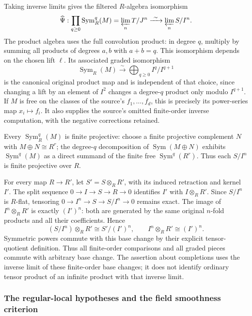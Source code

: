 Taking inverse limits gives the filtered \(R\)-algebra isomorphism \[
\widehat\Psi:\prod_{q\ge0}\operatorname{Sym}_R^q(M)
=\varprojlim_n T/J^n
\xrightarrow{\ \sim\ }\varprojlim_n S/I^n.
\] The product algebra uses the full convolution product: in degree \(q\), multiply by summing all products of degrees \(a,b\) with \(a+b=q\). This isomorphism depends on the chosen lift \(\ell\). Its associated graded isomorphism \[
\operatorname{Sym}_R(M)\xrightarrow{\ \sim\ }\bigoplus_{q\ge0}I^q/I^{q+1}
\] is the canonical original product map and is independent of that choice, since changing a lift by an element of \(I^2\) changes a degree-\(q\) product only modulo \(I^{q+1}\). If \(M\) is free on the classes of the source's \(f_1,\ldots,f_d\), this is precisely its power-series map \(x_i\mapsto f_i\). It also supplies the source's omitted finite-order inverse computation, with the negative corrections retained.

Every \(\operatorname{Sym}_R^q(M)\) is finite projective: choose a finite projective complement \(N\) with \(M\oplus N\cong R^r\); the degree-\(q\) decomposition of \(\operatorname{Sym}(M\oplus N)\) exhibits \(\operatorname{Sym}^q(M)\) as a direct summand of the finite free \(\operatorname{Sym}^q(R^r)\). Thus each \(S/I^n\) is finite projective over \(R\).

For every map \(R\to R'\), let \(S'=S\otimes_RR'\), with its induced retraction and kernel \(I'\). The split sequence \(0\to I\to S\to R\to0\) identifies \(I'\) with \(I\otimes_RR'\). Since \(S/I^n\) is \(R\)-flat, tensoring \(0\to I^n\to S\to S/I^n\to0\) remains exact. The image of \(I^n\otimes_RR'\) is exactly \((I')^n\): both are generated by the same original \(n\)-fold products and all their coefficients. Hence \[
(S/I^n)\otimes_RR'\cong S'/(I')^n,\qquad
I^n\otimes_RR'\cong(I')^n.
\] Symmetric powers commute with this base change by their explicit tensor-quotient definition. Thus all finite-order comparisons and all graded pieces commute with arbitrary base change. The assertion about completions uses the inverse limit of these finite-order base changes; it does not identify ordinary tensor product of an infinite product with that inverse limit.

\subsubsection{The regular-local hypotheses and the field smoothness criterion}\label{algebra-proof-049-the-regular-local-hypotheses-and-the-field-smoothness-criterion}

